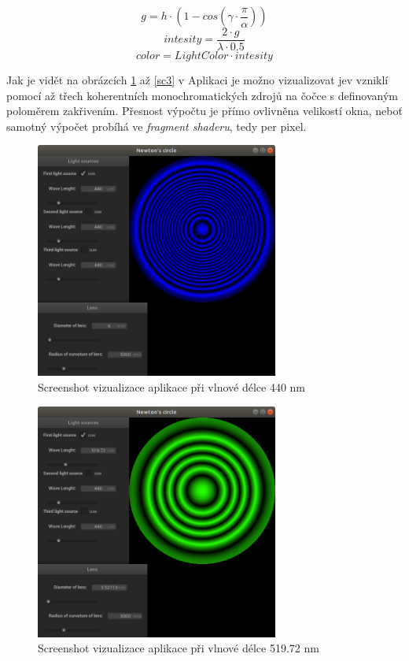 \documentclass[a4paper, 12pt]{article}
\begin{document}
		\begin{center}
	\begin{equation}
	\label{use}
	g = h \cdot (1 - cos(\gamma \cdot \frac{\pi}{\alpha}))  	
	\end{equation}
	\begin{equation}
	\label{gama2}
	intesity = \frac{2 \cdot g}{\lambda \cdot 0.5}
	\end{equation}
	\begin{equation}
	\label{right2}
	color = LightColor \cdot intesity	
	\end{equation}
\end{center} 

Jak je vidět na obrázcích \ref{sc1} až \ref{sc3} v Aplikaci je možno vizualizovat jev vzniklí pomocí až třech koherentních monochromatických zdrojů na čočce s definovaným poloměrem zakřivením. Přesnost výpočtu je přímo ovlivněna velikostí okna, neboť samotný výpočet probíhá ve \textit{fragment shaderu}, tedy per pixel.
  \begin{figure}
	\begin{center}
		
		\includegraphics[width=8cm]{sc1}
		\caption{Screenshot vizualizace aplikace  při vlnové délce 440 nm }
		\label{sc1}
	\end{center}
\end{figure}
  \begin{figure}
	\begin{center}
		
		\includegraphics[width=8cm]{sc2}
		\caption{Screenshot vizualizace aplikace  při vlnové délce 519.72 nm}
		\label{sc2}
	\end{center}
\end{figure}
\end{document}

